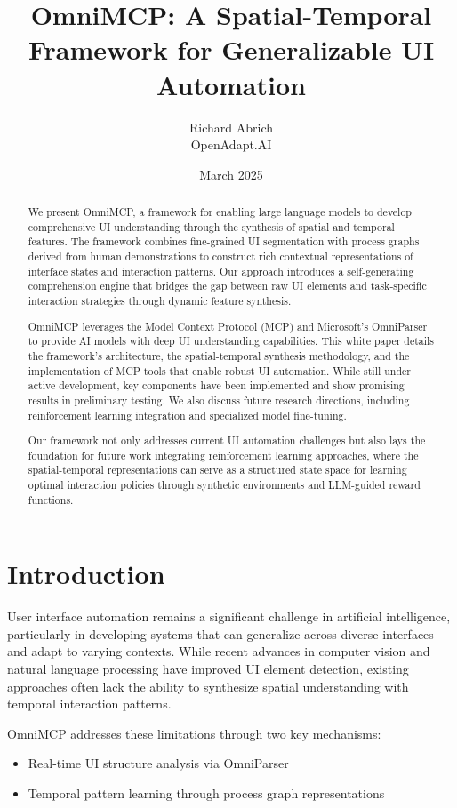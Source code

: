\documentclass{article}
\title{OmniMCP: A Spatial-Temporal Framework for Generalizable UI Automation}
\author{Richard Abrich \\ OpenAdapt.AI}
\date{March 2025}
\begin{document}
\maketitle

\begin{abstract}
We present OmniMCP, a framework for enabling large language models to develop comprehensive UI understanding through the synthesis of spatial and temporal features. The framework combines fine-grained UI segmentation with process graphs derived from human demonstrations to construct rich contextual representations of interface states and interaction patterns. Our approach introduces a self-generating comprehension engine that bridges the gap between raw UI elements and task-specific interaction strategies through dynamic feature synthesis.

OmniMCP leverages the Model Context Protocol (MCP) and Microsoft's OmniParser to provide AI models with deep UI understanding capabilities. This white paper details the framework's architecture, the spatial-temporal synthesis methodology, and the implementation of MCP tools that enable robust UI automation. While still under active development, key components have been implemented and show promising results in preliminary testing. We also discuss future research directions, including reinforcement learning integration and specialized model fine-tuning.

Our framework not only addresses current UI automation challenges but also lays the foundation for future work integrating reinforcement learning approaches, where the spatial-temporal representations can serve as a structured state space for learning optimal interaction policies through synthetic environments and LLM-guided reward functions.
\end{abstract}

\section{Introduction}

User interface automation remains a significant challenge in artificial intelligence, particularly in developing systems that can generalize across diverse interfaces and adapt to varying contexts. While recent advances in computer vision and natural language processing have improved UI element detection, existing approaches often lack the ability to synthesize spatial understanding with temporal interaction patterns.

OmniMCP addresses these limitations through two key mechanisms:
\begin{itemize}
    \item Real-time UI structure analysis via OmniParser
    \item Temporal pattern learning through process graph representations
\end{itemize}
\end{document}
